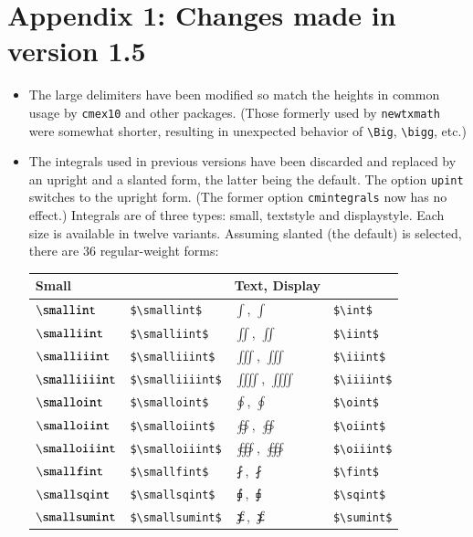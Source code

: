 \documentclass[\fsc]{article}
\theoremstyle{oldplain}
\theoremstyle{plain}
\begin{document}
\section{Appendix 1: Changes made in version 1.5}
\begin{itemize}
\item
The large delimiters have been modified so match the heights in common usage by \texttt{cmex10} and other packages. (Those formerly used by \texttt{newtxmath} were somewhat shorter, resulting in unexpected behavior of \verb|\Big|, \verb|\bigg|, etc.)
\item
The integrals used in previous versions have been discarded and replaced by an upright and a slanted form, the latter being the default. The option {\tt upint} switches to the upright form. (The former option {\tt cmintegrals} now has no effect.) Integrals are of three types: small, textstyle and displaystyle. Each size is available in twelve variants. Assuming slanted (the default) is selected, there are 36 regular-weight forms:
\setlength{\extrarowheight}{8pt}
\begin{center}
  \begin{tabular}{@{} llll @{}}
    \toprule
     Small && Text, Display& \\ 
    \midrule
$\smallint$  & \verb|$\smallint$|& $\int$, $\displaystyle{\int}$& \verb|$\int$|\\ 
$\smalliint$  & \verb|$\smalliint$|& $\iint$, $\displaystyle{\iint}$&\verb|$\iint$|\\ 
$\smalliiint$  & \verb|$\smalliiint$|& $\iiint$, $\displaystyle{\iiint}$& \verb|$\iiint$|\\ 
$\smalliiiint$  & \verb|$\smalliiiint$|& $\iiiint$, $\displaystyle{\iiiint}$& \verb|$\iiiint$|\\ 
$\smalloint$  & \verb|$\smalloint$|& $\oint$, $\displaystyle{\oint}$& \verb|$\oint$|\\ 
$\smalloiint$  & \verb|$\smalloiint$|& $\oiint$, $\displaystyle{\oiint}$& \verb|$\oiint$|\\ 
$\smalloiiint$  & \verb|$\smalloiiint$|& $\oiiint$, $\displaystyle{\oiiint}$& \verb|$\oiiint$|\\ 
$\smallfint$  & \verb|$\smallfint$|& $\fint$, $\displaystyle{\fint}$& \verb|$\fint$|\\ 
$\smallsqint$  & \verb|$\smallsqint$|& $\sqint$, $\displaystyle{\sqint}$& \verb|$\sqint$|\\ 
$\smallsumint$  & \verb|$\smallsumint$|& $\sumint$, $\displaystyle{\sumint}$& \verb|$\sumint$|\\ 

\end{tabular}
\end{center}
\end{itemize}
\end{document}
